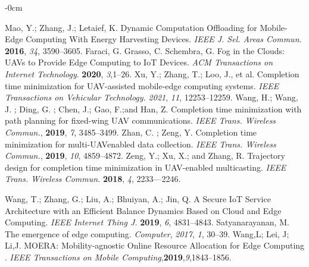 \documentclass[journal,article,submit,pdftex,moreauthors]{Definitions/mdpi}
\begin{document}
\begin{adjustwidth}{-\extralength}{0cm}
\begin{thebibliography}{999}
Mao, Y.; Zhang, J.; Letaief, K. Dynamic Computation Offloading for Mobile-Edge Computing With Energy Harvesting Devices. \emph{IEEE J. Sel. Areas Commun.} \textbf{2016}, \emph{34}, 3590--3605.
Faraci, G. Grasso, C. Schembra, G. Fog in the Clouds: UAVs to Provide Edge Computing to IoT Devices. \emph{ACM Transactions on Internet Technology}. \textbf{2020}, \emph{3},1--26.
Xu, Y.; Zhang, T.; Loo, J., et al. Completion time minimization for UAV-assisted mobile-edge computing systems. \emph{ IEEE Transactions on Vehicular Technology.} \emph{2021}, \emph{11}, 12253--12259.
Wang, H.; Wang, J. ; Ding, G. ; Chen, J.; Gao, F.;and Han, Z. Completion time minimization with path planning for fixed-wing UAV communications. \emph{IEEE Trans. Wireless Commun.}, \textbf{2019}, \emph{7}, 3485--3499.
Zhan, C. ; Zeng, Y.  Completion time minimization for multi-UAVenabled data collection.  \emph{IEEE Trans. Wireless Commun.}, \textbf{2019}, \emph{10}, 4859--4872. 
Zeng, Y.; Xu, X.; and Zhang, R. Trajectory design for completion time minimization in UAV-enabled multicasting. \emph{IEEE Trans. Wireless Commun.}  \textbf{2018}, \emph{4}, 2233—2246. 

Wang, T.; Zhang, G.; Liu, A.; Bhuiyan, A.; Jin, Q. A Secure IoT Service Architecture with an Efficient Balance Dynamics Based on Cloud and Edge Computing. \emph{IEEE Internet Thing J.} \textbf{2019}, \emph{6}, 4831--4843.
Satyanarayanan, M. The emergence of edge computing. \emph{Computer}, \emph{2017}, \emph{1},  30--39.
Wang,L; Lei, J; Li,J.  MOERA: Mobility-agnostic Online Resource Allocation for Edge Computing . \emph{IEEE Transactions on Mobile Computing},\textbf{2019},\emph{9},1843--1856. 



\end{thebibliography}
\end{adjustwidth}
\end{document}
